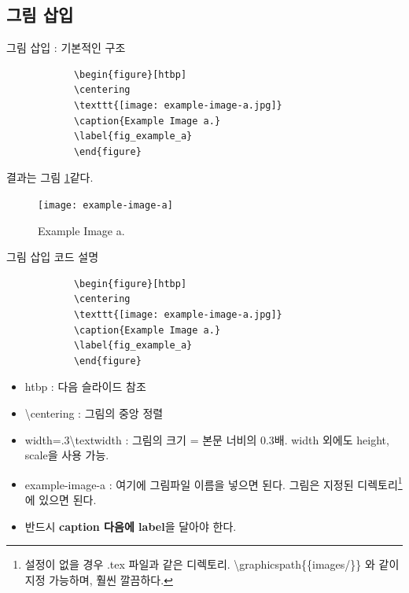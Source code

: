 \documentclass[12pt]{beamer}
\begin{document}
\subsection{그림 삽입}
\begin{frame}[fragile]{그림 삽입 : 기본적인 구조}
	\begin{center}
		\begin{scriptsize}
			\begin{verbatim}
			\begin{figure}[htbp]
			\centering
			\texttt{[image: example-image-a.jpg]}
			\caption{Example Image a.}
			\label{fig_example_a}
			\end{figure}
			\end{verbatim}
		\end{scriptsize}
	\end{center}
	결과는 그림 \ref{fig_example_a}\와 같다.
	
	\begin{figure}[htbp]
		\centering
		\texttt{[image: example-image-a]}
		\caption{Example Image a.}
		\label{fig_example_a}
	\end{figure}
\end{frame}
\begin{frame}[fragile]{그림 삽입 코드 설명}
	\begin{center}
		\begin{scriptsize}
			\begin{verbatim}
			\begin{figure}[htbp]
			\centering
			\texttt{[image: example-image-a.jpg]}
			\caption{Example Image a.}
			\label{fig_example_a}
			\end{figure}
			\end{verbatim}
		\end{scriptsize}
	\end{center}
	\begin{itemize}
		\item htbp : 다음 슬라이드 참조
		\item \textbackslash centering : 그림의 중앙 정렬
		\item width=.3\textbackslash textwidth : 그림의 크기 = 본문 너비의 0.3배. width 외에도 height, scale을 사용 가능.
		\item example-image-a : 여기에 그림파일 이름을 넣으면 된다. 그림은 지정된 디렉토리\footnote{설정이 없을 경우 .tex 파일과 같은 디렉토리. \textbackslash graphicspath\{\{images/\}\} 와 같이 지정 가능하며, 훨씬 깔끔하다.}에 있으면 된다.
		\item 반드시 \textbf{caption 다음에 label}을 달아야 한다.
	\end{itemize}
\end{frame}
\end{document}
